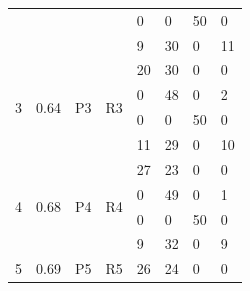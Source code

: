 \documentclass[USenglish]{ifimaster}  %
\begin{document}
\begin{table}[h]
{\begin{tabular}{@{}llllllll@{}}
\multicolumn{1}{l|}{} & \multicolumn{1}{l|}{} & \multicolumn{1}{l|}{} & \multicolumn{1}{l|}{} & \multicolumn{1}{l|}{0} & \multicolumn{1}{l|}{0} & \multicolumn{1}{l|}{50} & 0 \\ \cmidrule(l){5-8} 
\multicolumn{1}{l|}{} & \multicolumn{1}{l|}{} & \multicolumn{1}{l|}{} & \multicolumn{1}{l|}{} & \multicolumn{1}{l|}{9} & \multicolumn{1}{l|}{30} & \multicolumn{1}{l|}{0} & 11 \\ \midrule
\multicolumn{1}{l|}{\multirow{4}{*}{3}} & \multicolumn{1}{l|}{\multirow{4}{*}{0.64}} & \multicolumn{1}{l|}{\multirow{4}{*}{P3}} & \multicolumn{1}{l|}{\multirow{4}{*}{R3}} & \multicolumn{1}{l|}{20} & \multicolumn{1}{l|}{30} & \multicolumn{1}{l|}{0} & 0 \\ \cmidrule(l){5-8} 
\multicolumn{1}{l|}{} & \multicolumn{1}{l|}{} & \multicolumn{1}{l|}{} & \multicolumn{1}{l|}{} & \multicolumn{1}{l|}{0} & \multicolumn{1}{l|}{48} & \multicolumn{1}{l|}{0} & 2 \\ \cmidrule(l){5-8} 
\multicolumn{1}{l|}{} & \multicolumn{1}{l|}{} & \multicolumn{1}{l|}{} & \multicolumn{1}{l|}{} & \multicolumn{1}{l|}{0} & \multicolumn{1}{l|}{0} & \multicolumn{1}{l|}{50} & 0 \\ \cmidrule(l){5-8} 
\multicolumn{1}{l|}{} & \multicolumn{1}{l|}{} & \multicolumn{1}{l|}{} & \multicolumn{1}{l|}{} & \multicolumn{1}{l|}{11} & \multicolumn{1}{l|}{29} & \multicolumn{1}{l|}{0} & 10 \\ \midrule
\multicolumn{1}{l|}{\multirow{4}{*}{4}} & \multicolumn{1}{l|}{\multirow{4}{*}{0.68}} & \multicolumn{1}{l|}{\multirow{4}{*}{P4}} & \multicolumn{1}{l|}{\multirow{4}{*}{R4}} & \multicolumn{1}{l|}{27} & \multicolumn{1}{l|}{23} & \multicolumn{1}{l|}{0} & 0 \\ \cmidrule(l){5-8} 
\multicolumn{1}{l|}{} & \multicolumn{1}{l|}{} & \multicolumn{1}{l|}{} & \multicolumn{1}{l|}{} & \multicolumn{1}{l|}{0} & \multicolumn{1}{l|}{49} & \multicolumn{1}{l|}{0} & 1 \\ \cmidrule(l){5-8} 
\multicolumn{1}{l|}{} & \multicolumn{1}{l|}{} & \multicolumn{1}{l|}{} & \multicolumn{1}{l|}{} & \multicolumn{1}{l|}{0} & \multicolumn{1}{l|}{0} & \multicolumn{1}{l|}{50} & 0 \\ \cmidrule(l){5-8} 
\multicolumn{1}{l|}{} & \multicolumn{1}{l|}{} & \multicolumn{1}{l|}{} & \multicolumn{1}{l|}{} & \multicolumn{1}{l|}{9} & \multicolumn{1}{l|}{32} & \multicolumn{1}{l|}{0} & 9 \\ \midrule
\multicolumn{1}{l|}{\multirow{4}{*}{5}} & \multicolumn{1}{l|}{\multirow{4}{*}{0.69}} & \multicolumn{1}{l|}{\multirow{4}{*}{P5}} & \multicolumn{1}{l|}{\multirow{4}{*}{R5}} & \multicolumn{1}{l|}{26} & \multicolumn{1}{l|}{24} & \multicolumn{1}{l|}{0} & 0 \\ \cmidrule(l){5-8} 

\end{tabular}}
\end{table}
\end{document}
